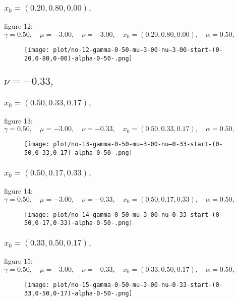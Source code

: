 \documentclass[a4paper]{article}
\begin{document}
\begin{multicols*}{2}
   \subsubsection{\(x_0 = (0.20,0.80,0.00),\quad \)}
   
figure 12: \(\gamma = 0.50,\quad \mu = -3.00,\quad \nu = -3.00,\quad x_0 = (0.20,0.80,0.00),\quad \alpha = 0.50,\quad \)
   \begin{figure}[H]
   \centering
   \texttt{[image: plot/no-12-gamma-0-50-mu--3-00-nu--3-00-start-(0-20,0-80,0-00)-alpha-0-50-.png]}
   \end{figure}
   

   \subsection{\(\nu = -0.33,\quad \)}
   

   \subsubsection{\(x_0 = (0.50,0.33,0.17),\quad \)}
   
figure 13: \(\gamma = 0.50,\quad \mu = -3.00,\quad \nu = -0.33,\quad x_0 = (0.50,0.33,0.17),\quad \alpha = 0.50,\quad \)
   \begin{figure}[H]
   \centering
   \texttt{[image: plot/no-13-gamma-0-50-mu--3-00-nu--0-33-start-(0-50,0-33,0-17)-alpha-0-50-.png]}
   \end{figure}
   

   \subsubsection{\(x_0 = (0.50,0.17,0.33),\quad \)}
   
figure 14: \(\gamma = 0.50,\quad \mu = -3.00,\quad \nu = -0.33,\quad x_0 = (0.50,0.17,0.33),\quad \alpha = 0.50,\quad \)
   \begin{figure}[H]
   \centering
   \texttt{[image: plot/no-14-gamma-0-50-mu--3-00-nu--0-33-start-(0-50,0-17,0-33)-alpha-0-50-.png]}
   \end{figure}
   

   \subsubsection{\(x_0 = (0.33,0.50,0.17),\quad \)}
   
figure 15: \(\gamma = 0.50,\quad \mu = -3.00,\quad \nu = -0.33,\quad x_0 = (0.33,0.50,0.17),\quad \alpha = 0.50,\quad \)
   \begin{figure}[H]
   \centering
   \texttt{[image: plot/no-15-gamma-0-50-mu--3-00-nu--0-33-start-(0-33,0-50,0-17)-alpha-0-50-.png]}
   \end{figure}
   


\end{multicols*}
\end{document}
